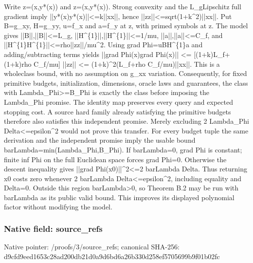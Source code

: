 \documentclass[10pt,a4paper]{article}
\begin{document}
Write z=(x,y*(x)) and z=(x,y*(x)). Strong convexity and the L\_gLipschitz full gradient imply ||y*(x)y*(x)||<=k||xx||, hence ||zz||<=sqrt(1+k\textasciicircum{}2)||xx||. Put B=g\_xy, H=g\_yy, u=f\_x and a=f\_y at z, with primed symbols at z. The model gives ||B||,||B||<=L\_g, ||H\textasciicircum{}\{1\}||,||H\textasciicircum{}\{1\}||<=1/mu, ||a||,||a||<=C\_f, and ||H\textasciicircum{}\{1\}H\textasciicircum{}\{1\}||<=rho||zz||/mu\textasciicircum{}2. Using grad Phi=uBH\textasciicircum{}\{1\}a and adding/subtracting terms yields
||grad Phi(x)grad Phi(x)|| <= [(1+k)L\_f+(1+k)rho C\_f/mu] ||zz|| <= (1+k)\textasciicircum{}2(L\_f+rho C\_f/mu)||xx||.
This is a wholeclass bound, with no assumption on g\_xx variation. Consequently, for fixed primitive budgets, initialization, dimensions, oracle laws and guarantees, the class with Lambda\_Phi>=B\_Phi is exactly the class before imposing the Lambda\_Phi promise. The identity map preserves every query and expected stopping cost. A source hard family already satisfying the primitive budgets therefore also satisfies this independent promise. Merely excluding 2 Lambda\_Phi Delta<=epsilon\textasciicircum{}2 would not prove this transfer. For every budget tuple the same derivation and the independent promise imply the usable bound barLambda=min(Lambda\_Phi,B\_Phi). If barLambda=0, grad Phi is constant; finite inf Phi on the full Euclidean space forces grad Phi=0. Otherwise the descent inequality gives ||grad Phi(x0)||\textasciicircum{}2<=2 barLambda Delta. Thus returning x0 costs zero whenever 2 barLambda Delta<=epsilon\textasciicircum{}2, including equality and Delta=0. Outside this region barLambda>0, so Theorem B.2 may be run with barLambda as its public valid bound. This improves its displayed polynomial factor without modifying the model.


\subsubsection{Native field: source\_refs}


Native pointer: /proofs/3/source\_refs; canonical SHA-256: d9cfd9eed1653c28ad200db2\allowbreak{}1d0a9d6bd6a26b330d258ef5\allowbreak{}705699b9f01b02fc
\end{document}

